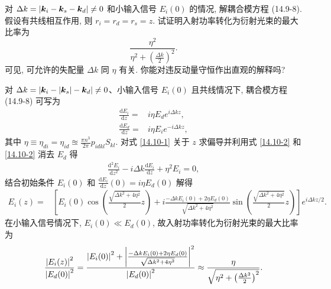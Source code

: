 \documentclass[twoside]{note}
\begin{document}
\begin{exe}
    对 $\Delta k=\left\lvert\bm{k}_i-\bm{k}_s-\bm{k}_d\right\rvert\neq 0$ 和小输入信号 $E_i(0)$ 的情况, 解耦合模方程 (14.9-8). 假设有共线相互作用, 则 $r_i=r_d=r_s=z$. 试证明入射功率转化为衍射光束的最大比率为
    \[
        \frac{\eta^2}{\eta^2+\left(\frac{\Delta k}{2}\right)^2}.
    \]
    可见, 可允许的失配量 $\Delta k$ 同 $\eta$ 有关. 你能对违反动量守恒作出直观的解释吗?
\end{exe}
\begin{pf}
    对 $\Delta k=\left\lvert\bm{k}_i-\left\lvert\bm{k}_s\right\rvert-\bm{k}_d\right\rvert\neq 0$、小输入信号 $E_i(0)$ 且共线情况下, 耦合模方程 (14.9-8) 可写为
    \begin{align}
        \label{14.10-1}
        \frac{\mathrm{d}E_i}{\mathrm{d}z}=&i\eta E_de^{i\Delta kz},\\
        \label{14.10-2}
        \frac{\mathrm{d}E_d}{\mathrm{d}z}=&i\eta E_ie^{-i\Delta kz},
    \end{align}
    其中 $\eta\equiv\eta_{di}=\eta_{id}\approxeq\frac{\pi n^3}{2\pi}p_{idkl}S_{kl}$.
    对式 \eqref{14.10-1} 关于 $z$ 求偏导并利用式 \eqref{14.10-2} 和 \eqref{14.10-2} 消去 $E_d$ 得
    \begin{align}
        \frac{\mathrm{d}^2E_i}{\mathrm{d}z^2}-i\Delta k\frac{\mathrm{d}E_i}{\mathrm{d}z}+\eta^2E_i=0,
    \end{align}
    结合初始条件 $E_i(0)$ 和 $\frac{\mathrm{d}E_i}{\mathrm{d}z}(0)=i\eta E_d(0)$ 解得
    \begin{align}
        E_i(z)=&\left[E_i(0)\cos\left(\frac{\sqrt{\Delta k^2+4\eta^2}}{2}z\right)+i\frac{-\Delta kE_i(0)+2\eta E_d(0)}{\sqrt{\Delta k^2+4\eta^2}}\sin\left(\frac{\sqrt{\Delta k^2+4\eta^2}}{2}z\right)\right]e^{i\Delta kz/2}.
    \end{align}
    在小输入信号情况下, $E_i(0)\ll E_d(0)$, 故入射功率转化为衍射光束的最大比率为
    \begin{align}
        \frac{\left\lvert E_i(z)\right\rvert^2}{\left\lvert E_d(0)\right\rvert^2}=\frac{\left\lvert E_i(0)\right\rvert^2+\left\lvert\frac{-\Delta kE_i(0)+2\eta E_d(0)}{\sqrt{\Delta k^2+4\eta^2}}\right\rvert^2}{\left\lvert E_d(0)\right\rvert^2}\approx\frac{\eta}{\sqrt{\eta^2+\left(\frac{\Delta k^2}{2}\right)^2}}.
    \end{align}
\end{pf}%
\end{document}
